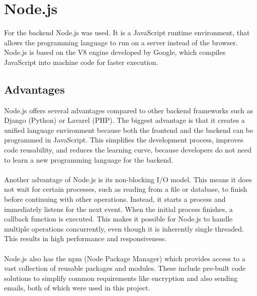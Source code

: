 \documentclass[a4paper,12pt]{report}
\begin{document}
\section{Node.js}
For the backend Node.js was used. It is a JavaScript runtime environment, that allows the programming language to run on a server instead of the browser. Node.js is based on the V8 engine developed by Google, which compiles JavaScript into machine code for faster execution. \parencite{nodejs-intro} \\
\subsection{Advantages}  
Node.js offers several advantages compared to other backend frameworks such as Django (Python) or Lavarel (PHP). The biggest advantage is that it creates a unified language environment because both the frontend and the backend can be programmed in JavaScript. This simplifies the development process, improves code reusability, and reduces the learning curve, because developers do not need to learn a new programming language for the backend. \\\\
Another advantage of Node.js is its non-blocking I/O model. This means it does not wait for certain processes, such as reading from a file or database, to finish before continuing with other operations. Instead, it starts a process and immediately listens for the next event. When the initial process finishes, a callback function is executed. This makes it possible for Node.js to handle multiple operations concurrently, even though it is inherently single threaded. This results in high performance and responsiveness. \parencite{nodejs-nonblocking} \\\\
Node.js also has the npm (Node Package Manager) which provides access to a vast collection of reusable packages and modules. These include pre-built code solutions to simplify common requirements like encryption and also sending emails, both of which were used in this project. \parencite{mdn-express-nodejs} \\\\
\end{document}

